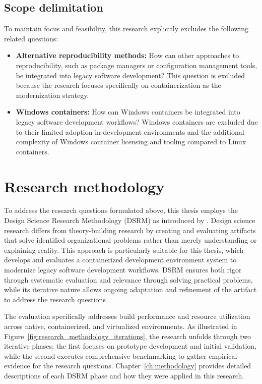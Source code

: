 \subsection{Scope delimitation}

To maintain focus and feasibility, this research explicitly excludes the following related questions:

\begin{itemize}
	\item \textbf{Alternative reproducibility methods:} How can other approaches to reproducibility, such as package managers or configuration management tools, be integrated into legacy software development?
	This question is excluded because the research focuses specifically on containerization as the modernization strategy.
	\item \textbf{Windows containers:} How can Windows containers be integrated into legacy software development workflows?
	Windows containers are excluded due to their limited adoption in development environments and the additional complexity of Windows container licensing and tooling compared to Linux containers.
\end{itemize}

\section{Research methodology}
\label{sec:research_methodology}

To address the research questions formulated above, this thesis employs the Design Science Research Methodology (DSRM) as introduced by \citet{peffersDesignScienceResearch2007}.
Design science research differs from theory-building research by creating and evaluating artifacts that solve identified organizational problems rather than merely understanding or explaining reality.
This approach is particularly suitable for this thesis, which develops and evaluates a containerized development environment system to modernize legacy software development workflows.
DSRM ensures both rigor through systematic evaluation and relevance through solving practical problems, while its iterative nature allows ongoing adaptation and refinement of the artifact to address the research questions \citep{peffersDesignScienceResearch2007}.

The evaluation specifically addresses build performance and resource utilization across native, containerized, and virtualized environments.
As illustrated in Figure~\ref{fig:research_methodology_iterations}, the research unfolds through two iterative phases: the first focuses on prototype development and initial validation, while the second executes comprehensive benchmarking to gather empirical evidence for the research questions.
Chapter~\ref{ch:methodology} provides detailed descriptions of each DSRM phase and how they were applied in this research.

